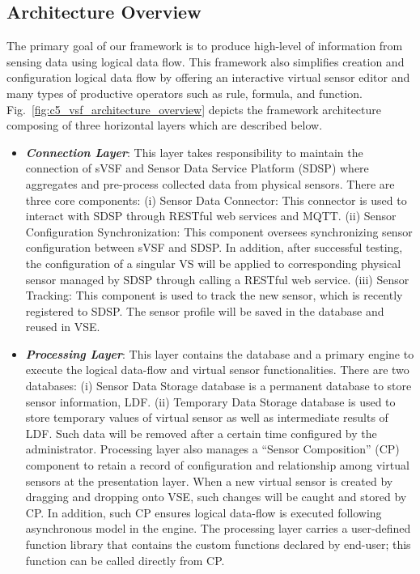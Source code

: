 \subsection{Architecture Overview}

The primary goal of our framework is to produce high-level of information from sensing data using logical data flow. This framework also simplifies creation and configuration logical data flow by offering an interactive virtual sensor editor and many types of productive operators such as rule, formula, and function. Fig.~\ref{fig:c5_vsf_architecture_overview} depicts the framework architecture composing of three horizontal layers which are described below.
\begin{itemize}
    \item \textbf{\textit{Connection Layer}}: This layer takes responsibility to maintain the connection of sVSF and Sensor Data Service Platform (SDSP) where aggregates and pre-process collected data from physical sensors. There are three core components: (i) Sensor Data Connector: This connector is used to interact with SDSP through RESTful web services and MQTT. (ii) Sensor Configuration Synchronization: This component oversees synchronizing sensor configuration between sVSF and SDSP. In addition, after successful testing, the configuration of a singular VS will be applied to corresponding physical sensor managed by SDSP through calling a RESTful web service. (iii) Sensor Tracking: This component is used to track the new sensor, which is recently registered to SDSP. The sensor profile will be saved in the database and reused in VSE.
    \item \textbf{\textit{Processing Layer}}: This layer contains the database and a primary engine to execute the logical data-flow and virtual sensor functionalities. There are two databases: (i) Sensor Data Storage database is a permanent database to store sensor information, LDF. (ii) Temporary Data Storage database is used to store temporary values of virtual sensor as well as intermediate results of LDF. Such data will be removed after a certain time configured by the administrator. Processing layer also manages a “Sensor Composition” (CP) component to retain a record of configuration and relationship among virtual sensors at the presentation layer. When a new virtual sensor is created by dragging and dropping onto VSE, such changes will be caught and stored by CP. In addition, such CP ensures logical data-flow is executed following asynchronous model in the engine. The processing layer carries a user-defined function library that contains the custom functions declared by end-user; this function can be called directly from CP.

\end{itemize}
